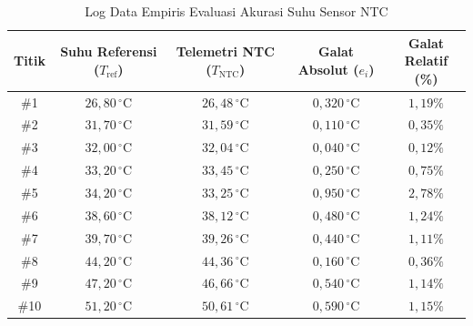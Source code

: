 \begin{table}[htbp]
\centering
\caption{Log Data Empiris Evaluasi Akurasi Suhu Sensor NTC}
\label{tab:test01_ntc_accuracy}
\small
\setlength{\tabcolsep}{6pt}
\begin{tabular}{|c|c|c|c|c|}
\hline
\textbf{Titik} & \shortstack{\textbf{Suhu Referensi} \\ \textbf{($T_{\mathrm{ref}}$)}} & \shortstack{\textbf{Telemetri NTC} \\ \textbf{($T_{\mathrm{NTC}}$)}} & \shortstack{\textbf{Galat Absolut} \\ \textbf{($e_i$)}} & \shortstack{\textbf{Galat Relatif} \\ \textbf{(\%)}} \\ \hline
\#1 & $26{,}80\,^\circ\mathrm{C}$ & $26{,}48\,^\circ\mathrm{C}$ & $0{,}320\,^\circ\mathrm{C}$ & $1{,}19\%$ \\ \hline
\#2 & $31{,}70\,^\circ\mathrm{C}$ & $31{,}59\,^\circ\mathrm{C}$ & $0{,}110\,^\circ\mathrm{C}$ & $0{,}35\%$ \\ \hline
\#3 & $32{,}00\,^\circ\mathrm{C}$ & $32{,}04\,^\circ\mathrm{C}$ & $0{,}040\,^\circ\mathrm{C}$ & $0{,}12\%$ \\ \hline
\#4 & $33{,}20\,^\circ\mathrm{C}$ & $33{,}45\,^\circ\mathrm{C}$ & $0{,}250\,^\circ\mathrm{C}$ & $0{,}75\%$ \\ \hline
\#5 & $34{,}20\,^\circ\mathrm{C}$ & $33{,}25\,^\circ\mathrm{C}$ & $0{,}950\,^\circ\mathrm{C}$ & $2{,}78\%$ \\ \hline
\#6 & $38{,}60\,^\circ\mathrm{C}$ & $38{,}12\,^\circ\mathrm{C}$ & $0{,}480\,^\circ\mathrm{C}$ & $1{,}24\%$ \\ \hline
\#7 & $39{,}70\,^\circ\mathrm{C}$ & $39{,}26\,^\circ\mathrm{C}$ & $0{,}440\,^\circ\mathrm{C}$ & $1{,}11\%$ \\ \hline
\#8 & $44{,}20\,^\circ\mathrm{C}$ & $44{,}36\,^\circ\mathrm{C}$ & $0{,}160\,^\circ\mathrm{C}$ & $0{,}36\%$ \\ \hline
\#9 & $47{,}20\,^\circ\mathrm{C}$ & $46{,}66\,^\circ\mathrm{C}$ & $0{,}540\,^\circ\mathrm{C}$ & $1{,}14\%$ \\ \hline
\#10 & $51{,}20\,^\circ\mathrm{C}$ & $50{,}61\,^\circ\mathrm{C}$ & $0{,}590\,^\circ\mathrm{C}$ & $1{,}15\%$ \\ \hline
\end{tabular}
\end{table}

